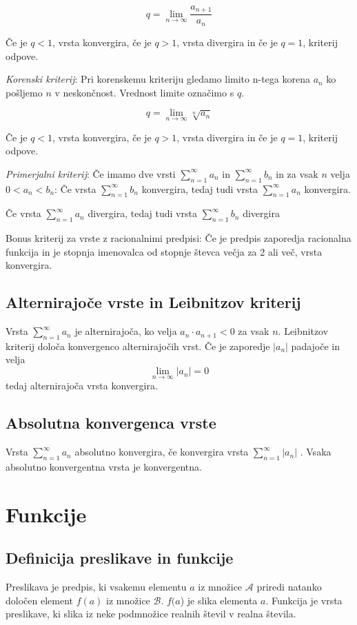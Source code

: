 \documentclass[12pt]{report}
\begin{document}
 \[q = \lim_{n \to \infty}\frac{a_{n+1}}{a_n}\]
 
Če je $q < 1$, vrsta konvergira, če je $q > 1$, vrsta divergira in če je $q=1$, kriterij odpove.

\emph{Korenski kriterij}: Pri korenskemu kriteriju gledamo limito n-tega korena $a_n$ ko pošljemo $n$ v neskončnost. Vrednost limite označimo s $q$.
 
 \[q = \lim_{n \to \infty}\sqrt[n]{a_n}\]
 
Če je $q < 1$, vrsta konvergira, če je $q > 1$, vrsta divergira in če je $q=1$, kriterij odpove.

\emph{Primerjalni kriterij}: Če imamo dve vrsti $\displaystyle\sum_{n=1}^{\infty}a_n$ in $\displaystyle\sum_{n=1}^{\infty}b_n$ in za vsak $n$ velja $0<a_n<b_n$:
Če vrsta $\displaystyle\sum_{n=1}^{\infty}b_n$ konvergira, tedaj tudi vrsta $\displaystyle\sum_{n=1}^{\infty}a_n$ konvergira.

Če vrsta $\displaystyle\sum_{n=1}^{\infty}a_n$ divergira, tedaj tudi vrsta $\displaystyle\sum_{n=1}^{\infty}b_n$ divergira

Bonus kriterij za vrste z racionalnimi predpisi: Če je predpis zaporedja racionalna funkcija in je stopnja imenovalca od stopnje števca večja za 2 ali več, vrsta konvergira.

\section*{Alternirajoče vrste in Leibnitzov kriterij}
Vrsta  $\displaystyle\sum_{n=1}^{\infty}a_n$ je alternirajoča, ko velja $a_n \cdot a_{n+1}<0$ za vsak $n$. Leibnitzov kriterij določa konvergenco alternirajočih vrst. Če je zaporedje $|a_n|$ padajoče in velja
 \[\lim_{n \to \infty}|a_n|=0\]
tedaj alternirajoča vrsta konvergira.

\section*{Absolutna konvergenca vrste}
Vrsta $\displaystyle\sum_{n=1}^{\infty}a_n$ absolutno konvergira, če konvergira vrsta  $\displaystyle\sum_{n=1}^{\infty}|a_n|$ . Vsaka absolutno konvergentna vrsta je konvergentna.

 


\chapter*{Funkcije}

\section*{Definicija preslikave in funkcije}
Preslikava je predpis, ki vsakemu elementu $a$ iz množice $ \mathcal{A}$ priredi natanko določen element $f(a)$ iz množice $ \mathcal{B}$. $f(a$) je slika elementa $a$. 
Funkcija je vrsta preslikave, ki slika iz neke podmnožice realnih števil v realna števila.
\end{document}
